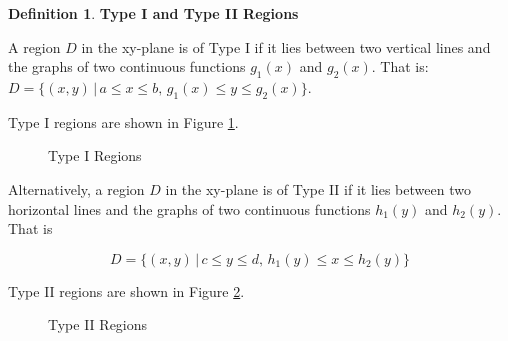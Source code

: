 \documentclass{article}
\theoremstyle{definition}
\newtheorem{definition}{Definition}[section]
\begin{document}
\bigskip
\begin{definition}
{\bf Type I and Type II Regions}

\bigskip
\noindent
A region $D$ in the xy-plane is of Type I if it lies between two
vertical lines and the graphs of two continuous functions
$g_1(x)$ and $g_2(x)$. That is:
$D = \{(x, y) \, | \, a \leq x \leq b, \, g_1(x)  \leq y \leq  g_2(x)\}$.

\bigskip
\noindent
Type I regions are shown in Figure \ref{fig:type_I_region}.


\bigskip
\begin{figure}[H]
\caption{Type I Regions}
\label{fig:type_I_region}
\end{figure}

\bigskip
\noindent
Alternatively, a region $D$ in the xy-plane is of Type II if it
lies between two horizontal lines and the graphs of two
continuous functions $h_1(y)$ and $h_2(y)$. That is

\bigskip
\begin{equation*}
D = \{(x, y) \, | \, c \leq y \leq d, \, h_1(y)  \leq x \leq  h_2(y)\}
\end{equation*}

\bigskip
\noindent
Type II regions are shown in  Figure \ref{fig:type_II_region}.

\bigskip
\begin{figure}[H]
\caption{Type II Regions}
\label{fig:type_II_region}
\end{figure}
\end{definition}
\end{document}
